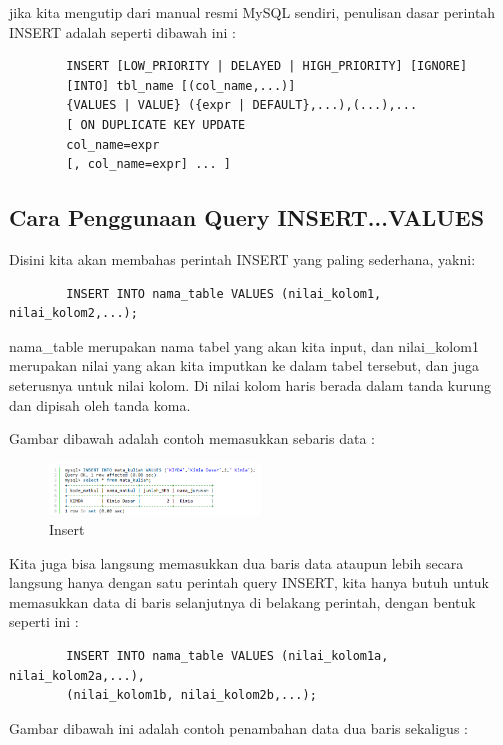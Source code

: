 	jika kita mengutip dari manual resmi MySQL sendiri, penulisan dasar perintah INSERT adalah seperti dibawah ini :
	
	\begin{verbatim}
		INSERT [LOW_PRIORITY | DELAYED | HIGH_PRIORITY] [IGNORE]
		[INTO] tbl_name [(col_name,...)]
		{VALUES | VALUE} ({expr | DEFAULT},...),(...),...
		[ ON DUPLICATE KEY UPDATE
		col_name=expr
		[, col_name=expr] ... ]
	\end{verbatim}
	
	\subsection{Cara Penggunaan Query INSERT...VALUES}
	Disini kita akan membahas perintah INSERT yang paling sederhana, yakni:
	
	\begin{verbatim}
		INSERT INTO nama_table VALUES (nilai_kolom1, nilai_kolom2,...);
	\end{verbatim}
	
	nama_table merupakan nama tabel yang akan kita input, dan nilai_kolom1 merupakan nilai yang akan kita imputkan ke dalam tabel tersebut, dan juga seterusnya untuk nilai kolom. Di nilai kolom haris berada dalam tanda kurung dan dipisah oleh tanda koma.
	
	Gambar dibawah adalah contoh memasukkan sebaris data :
	
	\begin{figure}[ht]
			\centerline{\includegraphics[width=0.5\textwidth]{figures/insert.png}}
			\caption{Insert}
			\label{insert}
			\end{figure}
			
	Kita juga bisa langsung memasukkan dua baris data ataupun lebih secara langsung hanya dengan satu perintah query INSERT, kita hanya butuh untuk memasukkan data di baris selanjutnya di belakang perintah, dengan bentuk seperti ini :
	
	\begin{verbatim}
		INSERT INTO nama_table VALUES (nilai_kolom1a, nilai_kolom2a,...), 
		(nilai_kolom1b, nilai_kolom2b,...);
	\end{verbatim}
	
	Gambar dibawah ini adalah contoh penambahan data dua baris sekaligus :
	
